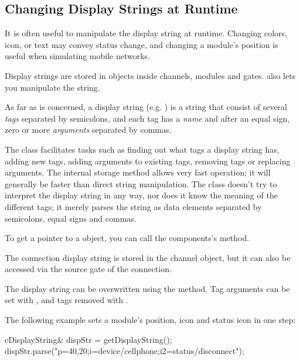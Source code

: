 \subsection{Changing Display Strings at Runtime}
\label{sec:graphics:changing-displaystrings-at-runtime}

It is often useful to manipulate the display string at runtime.
Changing colors, icon, or text may convey status change, and
changing a module's position is useful when simulating mobile
networks.

Display strings are stored in  objects inside
channels, modules and gates.  also lets you
manipulate the string.

As far as  is concerned, a display string
(e.g. ) is a string that consist of several
\textit{tags} separated by semicolons, and each tag has a \textit{name}
and after an equal sign, zero or more \textit{arguments} separated by commas.

The class facilitates tasks such as finding out what tags a display string
has, adding new tags, adding arguments to existing tags, removing tags or
replacing arguments. The internal storage method allows very fast
operation; it will generally be faster than direct string manipulation. The
class doesn't try to interpret the display string in any way, nor does it
know the meaning of the different tags; it merely parses the string as data
elements separated by semicolons, equal signs and commas.

To get a pointer to a  object, you can call
the components's  method.

\begin{note}
The connection display string is stored in the channel object, but it
can also be accessed via the source gate of the connection.
\end{note}

The display string can be overwritten using the  method.
Tag arguments can be set with , and tags removed
with .

The following example sets a module's position, icon and status icon
in one step:

\begin{cpp}
cDisplayString& dispStr = getDisplayString();
dispStr.parse("p=40,20;i=device/cellphone;i2=status/disconnect");
\end{cpp}

